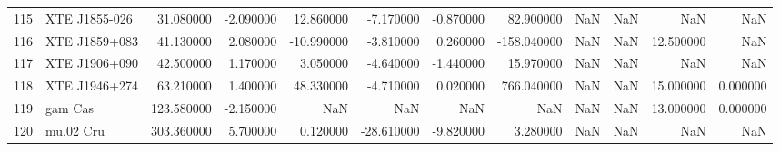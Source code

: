 \begin{tabular}{llrrrrrrrrrr}
115 & XTE J1855-026 & 31.080000 & -2.090000 & 12.860000 & -7.170000 & -0.870000 & 82.900000 & NaN & NaN & NaN & NaN \\
116 & XTE J1859+083 & 41.130000 & 2.080000 & -10.990000 & -3.810000 & 0.260000 & -158.040000 & NaN & NaN & 12.500000 & NaN \\
117 & XTE J1906+090 & 42.500000 & 1.170000 & 3.050000 & -4.640000 & -1.440000 & 15.970000 & NaN & NaN & NaN & NaN \\
118 & XTE J1946+274 & 63.210000 & 1.400000 & 48.330000 & -4.710000 & 0.020000 & 766.040000 & NaN & NaN & 15.000000 & 0.000000 \\
119 & gam Cas & 123.580000 & -2.150000 & NaN & NaN & NaN & NaN & NaN & NaN & 13.000000 & 0.000000 \\
120 & mu.02 Cru & 303.360000 & 5.700000 & 0.120000 & -28.610000 & -9.820000 & 3.280000 & NaN & NaN & NaN & NaN \\
\bottomrule
\end{tabular}
